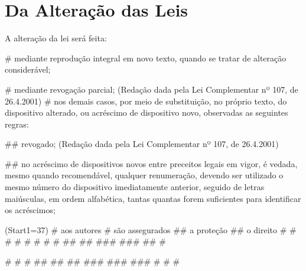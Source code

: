 \documentclass[a4paper,capitulo,titlepage=false]{br-lex}
\begin{document}
	\section{Da Alteração das Leis}
	
	\artigo A alteração da lei será feita:
	
	\begin{easylist}
		#  mediante reprodução integral em novo texto, quando se tratar de alteração considerável;
		
		#  mediante revogação parcial;    (Redação dada pela Lei Complementar nº 107, de 26.4.2001)
		# nos demais casos, por meio de substituição, no próprio texto, do dispositivo alterado, ou acréscimo de dispositivo novo, observadas as seguintes regras:
		
		
		## revogado; (Redação dada pela Lei Complementar nº 107, de 26.4.2001)
		
		
		## no acréscimo de dispositivos novos entre preceitos legais em vigor, é vedada, mesmo quando recomendável, qualquer renumeração, devendo ser utilizado o mesmo número do dispositivo imediatamente anterior, seguido de letras maiúsculas, em ordem alfabética, tantas quantas forem suficientes para identificar os acréscimos;
			\end{easylist}

\begin{easylist}
\ListProperties(Start1=37)
# aos autores
# são assegurados
## a proteção ## o direito
#
#
#
#
#
#
#
#
##
##
###
###
##
#

\end{easylist}

\addtocounter{artigo}{100}

\artigo

\begin{easylist}
	#
	#
	#
	## ## ## 
	### ### ###
	#
	#
	#

\end{easylist}
\end{document}
